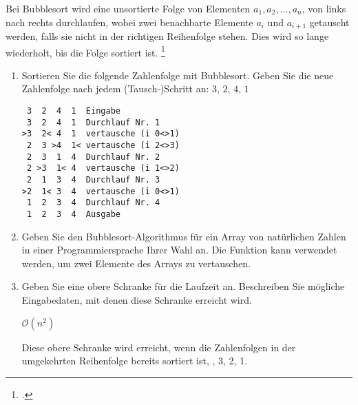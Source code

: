 \documentclass{bschlangaul-aufgabe}
\begin{document}

Bei Bubblesort wird eine unsortierte Folge von Elementen $a_1,
a_2,\dots, a_n$, von links nach rechts durchlaufen, wobei zwei
benachbarte Elemente $a_i$ und $a_{i + 1}$ getauscht werden, falls sie
nicht in der richtigen Reihenfolge stehen. Dies wird so lange
wiederholt, bis die Folge sortiert ist.
\footcite{examen:46115:2017:03}

\begin{enumerate}

\item Sortieren Sie die folgende Zahlenfolge mit Bubblesort. Geben Sie
die neue Zahlenfolge nach jedem (Tausch-)Schritt an: $3$, $2$, $4$, $1$

\begin{bAntwort}
\begin{verbatim}
 3  2  4  1  Eingabe
 3  2  4  1  Durchlauf Nr. 1
>3  2< 4  1  vertausche (i 0<>1)
 2  3 >4  1< vertausche (i 2<>3)
 2  3  1  4  Durchlauf Nr. 2
 2 >3  1< 4  vertausche (i 1<>2)
 2  1  3  4  Durchlauf Nr. 3
>2  1< 3  4  vertausche (i 0<>1)
 1  2  3  4  Durchlauf Nr. 4
 1  2  3  4  Ausgabe
\end{verbatim}
\end{bAntwort}


\item Geben Sie den Bubblesort-Algorithmus für ein Array von natürlichen
Zahlen in einer Programmiersprache Ihrer Wahl an. Die Funktion
 kann verwendet werden, um zwei
Elemente des Arrays zu vertauschen.

\begin{bAntwort}


\end{bAntwort}


\item Geben Sie eine obere Schranke für die Laufzeit an. Beschreiben Sie
mögliche Eingabedaten, mit denen diese Schranke erreicht wird.

\begin{bAntwort}
$\mathcal{O}(n^2)$

Diese obere Schranke wird erreicht, wenn die Zahlenfolgen in der
umgekehrten Reihenfolge bereits sortiert ist, , 3, 2, 1.
\end{bAntwort}

\end{enumerate}
\end{document}

